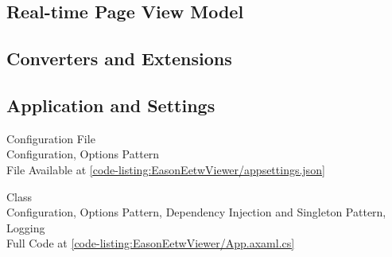 \clearpage
\subsection{Real-time Page View Model}

\clearpage
\subsection{Converters and Extensions}

\clearpage
\subsection{Application and Settings}

\begin{normallisting}
    \caption[ Configuration File]{
         Configuration File \\
        Configuration, Options Pattern \\
        File Available at \autoref{code-listing:EasonEetwViewer/appsettings.json}}
\end{normallisting}

\begin{normallisting}
    \caption[ Class]{
         Class \\
        Configuration, Options Pattern, Dependency Injection and Singleton Pattern, Logging \\
        Full Code at \autoref{code-listing:EasonEetwViewer/App.axaml.cs}}
\end{normallisting}